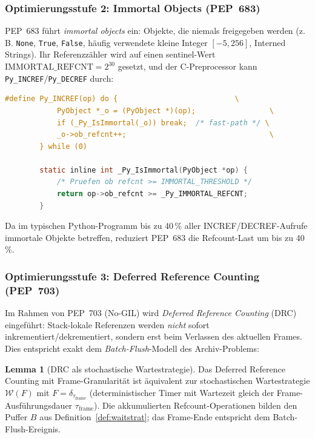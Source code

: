 ﻿\documentclass[a4paper,12pt]{scrreprt}
\theoremstyle{definition}
\newtheorem{lemma}{Lemma}[section]
\begin{document}
	\subsubsection{Optimierungsstufe 2: Immortal Objects (PEP~683)}
	
	PEP~683 \cite{pep683} führt \emph{immortal objects} ein: Objekte, die
	niemals freigegeben werden (z.\,B. \texttt{None}, \texttt{True},
	\texttt{False}, häufig verwendete kleine Integer $[-5, 256]$,
	Interned Strings). Ihr Referenzzähler wird auf einen sentinel-Wert
	$\mathrm{IMMORTAL\_REFCNT} = 2^{30}$ gesetzt, und der C-Preprocessor
	kann \texttt{Py\_INCREF}/\texttt{Py\_DECREF} durch:
	
	\begin{lstlisting}[language=C, caption={Immortal Object Check: INCREF wird wegoptimiert},
		label=lst:immortal]
		#define Py_INCREF(op) do {                           \
			PyObject *_o = (PyObject *)(op);                 \
			if (_Py_IsImmortal(_o)) break;  /* fast-path */ \
			_o->ob_refcnt++;                                 \
		} while (0)
		
		static inline int _Py_IsImmortal(PyObject *op) {
			/* Pruefen ob refcnt >= IMMORTAL_THRESHOLD */
			return op->ob_refcnt >= _Py_IMMORTAL_REFCNT;
		}
	\end{lstlisting}
	
	Da im typischen Python-Programm bis zu 40\,\% aller INCREF/DECREF-Aufrufe
	immortale Objekte betreffen, reduziert PEP~683 die Refcount-Last
	um bis zu 40\,\%.
	
	\subsubsection{Optimierungsstufe 3: Deferred Reference Counting (PEP~703)}
	
	Im Rahmen von PEP~703 (No-GIL) \cite{pep703} wird \emph{Deferred
		Reference Counting} (DRC) eingeführt: Stack-lokale Referenzen werden
	\emph{nicht} sofort inkrementiert/dekrementiert, sondern erst beim
	Verlassen des aktuellen Frames. Dies entspricht exakt dem
	\emph{Batch-Flush}-Modell des Archiv-Problems:
	
	\begin{lemma}[DRC als stochastische Wartestrategie]
		\label{lemma:drc_archiv}
		Das Deferred Reference Counting mit Frame-Granularität ist
		äquivalent zur stochastischen Wartestrategie $\mathcal{W}(F)$
		mit $F = \delta_{\tau_{\mathrm{frame}}}$ (deterministischer Timer
		mit Wartezeit gleich der Frame-Ausführungsdauer $\tau_{\mathrm{frame}}$).
		Die akkumulierten Refcount-Operationen bilden den Puffer $B$ aus
		Definition~\ref{def:waitstrat}; das Frame-Ende entspricht dem
		Batch-Flush-Ereignis.
	\end{lemma}
	
\end{document}
